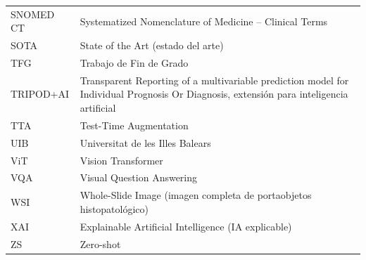\begin{longtable}{p{}p{}}
SNOMED CT & Systematized Nomenclature of Medicine -- Clinical Terms \\
SOTA & State of the Art (estado del arte) \\
TFG & Trabajo de Fin de Grado \\
TRIPOD+AI & Transparent Reporting of a multivariable prediction model for Individual Prognosis Or Diagnosis, extensión para inteligencia artificial \\
TTA & Test-Time Augmentation \\
UIB & Universitat de les Illes Balears \\
ViT & Vision Transformer \\
VQA & Visual Question Answering \\
WSI & Whole-Slide Image (imagen completa de portaobjetos histopatológico) \\
XAI & Explainable Artificial Intelligence (IA explicable) \\
ZS & Zero-shot \\
\end{longtable}


